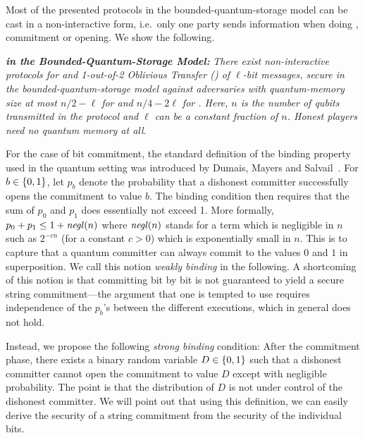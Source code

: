 Most of the presented protocols in the bounded-quantum-storage model
can be cast in a non-interactive form, i.e.~only one party sends
information when doing \pOT, commitment or opening. We show the following.

\medskip
\noindent
{\bf {\em \pOT in the Bounded-Quantum-Storage Model:}} {\em There
  exist non-interactive protocols for \RabinOT and 1-out-of-2
  Oblivious Transfer (\OT[2]) of $\ell$-bit messages, secure in the
  bounded-quantum-storage model against adversaries with
  quantum-memory size at most $n/2- \ell$ for \RabinOT and $n/4 -
  2\ell$ for \OT. Here, $n$ is the number of qubits transmitted in the
  protocol and $\ell$ can be a constant fraction of $n$. Honest
  players need no quantum memory at all.}  \medskip

For the case of bit commitment, the standard definition of the
binding property used in the quantum
setting was introduced by Dumais, Mayers and Salvail~\cite{DMS00}. For
$b \in \{0,1\}$, let $p_b$ denote the probability that a dishonest
committer successfully opens the commitment to value $b$. The binding
condition then requires that the sum of $p_0$ and $p_1$ does
essentially not exceed 1. More formally, $p_0 + p_1 \leq 1 + \mathit{negl}({n})$
where $\mathit{negl}({n})$ stands for a term which is negligible in $n$ such as
$2^{-cn}$ (for a constant $c>0$) which is exponentially small in $n$.
This is to capture that a quantum committer can always commit to the
values $0$ and $1$ in superposition. We call this notion \emph{weakly
  binding} in the following. A shortcoming of this notion is that
committing bit by bit is not guaranteed to yield a secure string
commitment---the argument that one is tempted to use requires
independence of the $p_{b}$'s between the different executions, which
in general does not hold.


Instead, we propose the following \emph{strong binding} condition:
After the commitment phase, there exists a binary random variable $D
\in \{0,1\}$ such that a dishonest committer cannot open the
commitment to value $D$ except with negligible probability. The point
is that the distribution of $D$ is not under control of the dishonest
committer. We will point out that using this definition, we can easily
derive the security of a string commitment from the security of the
individual bits.

